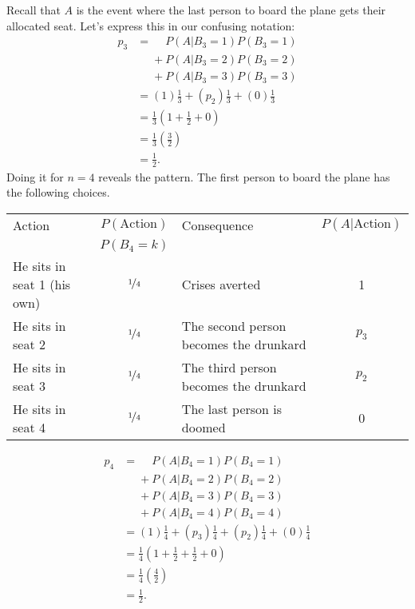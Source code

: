 \documentclass[a4paper]{article}
\begin{document}
Recall that $A$ is the event where the last person to board the plane gets their allocated seat. Let's express this in our confusing notation:
\begin{align*}
  p_3
  &=
       \phantom{{} + {}}    P(A|B_3 = 1)P(B_3=1) \\
      &\phantom{{} = {}} +  P(A|B_3 = 2)P(B_3=2) \\
      &\phantom{{} = {}} +  P(A|B_3 = 3)P(B_3=3)
  \\
  &=
  (1)   \frac{1}{3}  +
  (p_2) \frac{1}{3} +
  (0)   \frac{1}{3} \\
& =\frac{1}{3}\left(1 +  \frac{1}{2} + 0\right) \\
& =\frac{1}{3}\left(\frac{3}{2}\right)  \\
& =\frac{1}{2}
\text{.}
\end{align*}
Doing it for $n=4$ reveals the pattern.
The first person to board the plane has the following choices.
\begin{center}
\begin{tabular}{lclc}
\hline
 Action                    & $P(\text{Action})$ &  Consequence                             & $P(A|\text{Action})$ \\
                           & $P(B_4 = k)$       &                                          &               \\
 \hline
He sits in seat 1 (his own)& $\nicefrac{1}{4}$  &  Crises averted                          & 1\\
He sits in seat 2          & $\nicefrac{1}{4}$  &  The second person becomes the drunkard  & $p_3$\\
He sits in seat 3          & $\nicefrac{1}{4}$  &  The third person becomes the drunkard   & $p_2$\\
He sits in seat 4          & $\nicefrac{1}{4}$  &  The last person is doomed               & 0\\
\hline
\end{tabular}
\end{center}
\begin{align*}
  p_4
      &=  \phantom{{} + {}} P(A|B_4 = 1)P(B_4=1) \\
      &\phantom{{} = {}} +  P(A|B_4 = 2)P(B_4=2) \\
      &\phantom{{} = {}} +  P(A|B_4 = 3)P(B_4=3) \\
      &\phantom{{} = {}} +  P(A|B_4 = 4)P(B_4=4)
  \\
 & =
  (1)   \frac{1}{4} +
  (p_3) \frac{1}{4} +
  (p_2) \frac{1}{4} +
  (0)   \frac{1}{4} \\
& =\frac{1}{4}\left(1 +  \frac{1}{2} + \frac{1}{2} + 0\right) \\
& =\frac{1}{4}\left(\frac{4}{2}\right)  \\
& =\frac{1}{2}
\text{.}
\end{align*}
\end{document}
